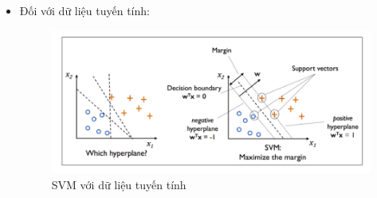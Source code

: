 \documentclass[a4paper, 12pt]{article}
\begin{document}
\begin{itemize}
    \item Đối với dữ liệu tuyến tính:
    \begin{figure}[H]
        \begin{center}
            \includegraphics[scale=0.3]{img/SVM-ex-2}
            \caption{SVM với dữ liệu tuyến tính}
        \end{center}
    \end{figure}


\end{itemize}
\end{document}
